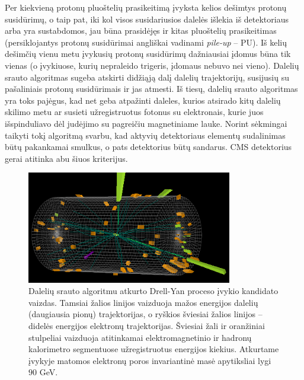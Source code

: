 \documentclass[a4paper, 12pt, oneside]{article}
\begin{document}
Per kiekvieną protonų pluoštelių prasikeitimą įvyksta kelios dešimtys protonų susidūrimų, o taip pat, iki kol
visos susidariusios dalelės išlekia iš detektoriaus arba yra sustabdomos, jau būna prasidėjęs ir kitas pluoštelių
prasikeitimas (persiklojantys protonų susidūrimai angliškai vadinami \textit{pile-up} -- PU).
Iš kelių dešimčių vienu metu įvykusių protonų susidūrimų dažniausiai įdomus būna tik vienas (o įvykiuose, kurių
nepraleido trigeris, įdomaus nebuvo nei vieno).
Dalelių srauto algoritmas sugeba atskirti didžiąją dalį dalelių trajektorijų, susijusių su pašaliniais
protonų susidūrimais ir jas atmesti.
Iš tiesų, dalelių srauto algoritmas yra toks pajėgus, kad net geba atpažinti daleles, kurios atsirado kitų dalelių skilimo metu
ar susieti užregistruotus fotonus su elektronais, kurie juos išspinduliavo dėl judėjimo su pagreičiu magnetiniame lauke.
Norint sėkmingai taikyti tokį algoritmą svarbu, kad aktyvių detektoriaus elementų sudalinimas būtų pakankamai smulkus,
o pats detektorius būtų sandarus.
CMS detektorius gerai atitinka abu šiuos kriterijus.

\begin{figure}[t]
	\includegraphics[width=0.8\textwidth]{Event.png}
	\caption{\label{fig:Event}
		Dalelių srauto algoritmu atkurto Drell-Yan proceso įvykio kandidato vaizdas.
		Tamsiai žalios linijos vaizduoja mažos energijos dalelių (daugiausia pionų) trajektorijas,
		o ryškios šviesiai žalios linijos -- didelės energijos elektronų trajektorijas.
		Šviesiai žali ir oranžiniai stulpeliai vaizduoja atitinkamai elektromagnetinio ir hadronų kalorimetro
		segmentuose užregistruotus energijos kiekius.
		Atkurtame įvykyje matomos elektronų poros invariantinė masė apytiksliai lygi $90$ GeV.
	}
\end{figure}
\end{document}
